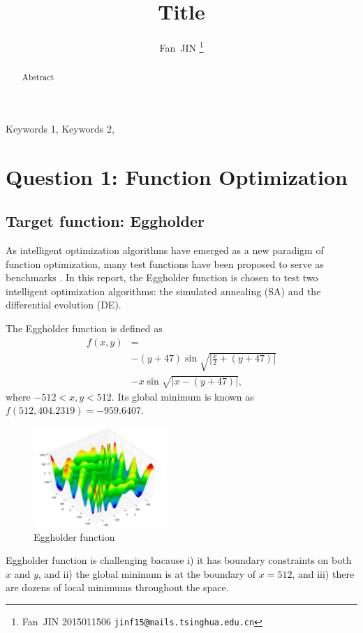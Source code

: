 \documentclass{IEEEtran}
\title{Title}
\author{
    Fan~JIN
    \thanks{Fan~JIN 2015011506  \texttt{jinf15@mails.tsinghua.edu.cn}}
}
\begin{document}
\maketitle
\begin{abstract}
    Abstract
\end{abstract}
\begin{IEEEkeywords}
    Keywords 1, Keywords 2,
\end{IEEEkeywords}

\section{Question 1: Function Optimization}
{
    \subsection{Target function: Eggholder}
    {
        As intelligent optimization algorithms have emerged as a new paradigm of function optimization, 
        many test functions have been proposed to serve as benchmarks \cite{wiki:Test_functions_for_optimization}.
        In this report, the Eggholder function is chosen to test two intelligent optimization algorithms:
        the simulated annealing (SA) and the differential evolution (DE).

        The Eggholder function is defined as
        \[
            \begin{split}
            f(x,y) &= \\
            &- (y+47) \sin{\sqrt{\left| \frac{x}{2}+(y+47) \right|}} \\
            &- x \sin{\sqrt{\left| x-(y+47) \right|}},
            \end{split}
        \]
        where $-512 < x,y < 512$.
        Its global minimum is known as $f(512, 404.2319) = -959.6407$.

        \begin{figure}[!htbp]
            \centering
            \includegraphics[width=0.45\textwidth]{figures/eggholder.png}
            \caption{Eggholder function \cite{wiki:Test_functions_for_optimization}}
            \label{fig:eggholder}
        \end{figure}

        Eggholder function is challenging bacause 
        i) it has boundary constraints on both $x$ and $y$, and 
        ii) the global minimum is at the boundary of $x=512$, and 
        iii) there are dozens of local minimums throughout the space.
        
    }
}



\end{document}
